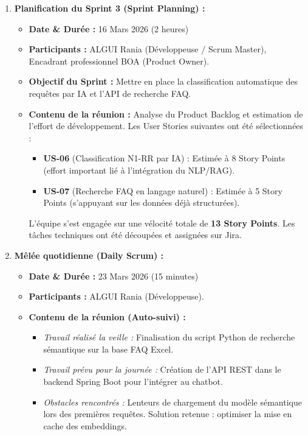 \begin{enumerate}
    \item \textbf{Planification du Sprint 3 (Sprint Planning) :}
    \begin{itemize}
        \item \textbf{Date \& Durée :} 16 Mars 2026 (2 heures)
        \item \textbf{Participants :} ALGUI Rania (Développeuse / Scrum Master), Encadrant professionnel BOA (Product Owner).
        \item \textbf{Objectif du Sprint :} Mettre en place la classification automatique des requêtes par IA et l'API de recherche FAQ.
        \item \textbf{Contenu de la réunion :} Analyse du Product Backlog et estimation de l'effort de développement. Les User Stories suivantes ont été sélectionnées :
        \begin{itemize}
            \item \textbf{US-06} (Classification N1-RR par IA) : Estimée à 8 Story Points (effort important lié à l'intégration du NLP/RAG).
            \item \textbf{US-07} (Recherche FAQ en langage naturel) : Estimée à 5 Story Points (s'appuyant sur les données déjà structurées).
        \end{itemize}
        L'équipe s'est engagée sur une vélocité totale de \textbf{13 Story Points}. Les tâches techniques ont été découpées et assignées sur Jira.
    \end{itemize}

    \item \textbf{Mêlée quotidienne (Daily Scrum) :}
    \begin{itemize}
        \item \textbf{Date \& Durée :} 23 Mars 2026 (15 minutes)
        \item \textbf{Participants :} ALGUI Rania (Développeuse).
        \item \textbf{Contenu de la réunion (Auto-suivi) :}
        \begin{itemize}
            \item \textit{Travail réalisé la veille :} Finalisation du script Python de recherche sémantique sur la base FAQ Excel.
            \item \textit{Travail prévu pour la journée :} Création de l'API REST dans le backend Spring Boot pour l'intégrer au chatbot.
            \item \textit{Obstacles rencontrés :} Lenteurs de chargement du modèle sémantique lors des premières requêtes. Solution retenue : optimiser la mise en cache des embeddings.
        \end{itemize}
    \end{itemize}


\end{enumerate}
